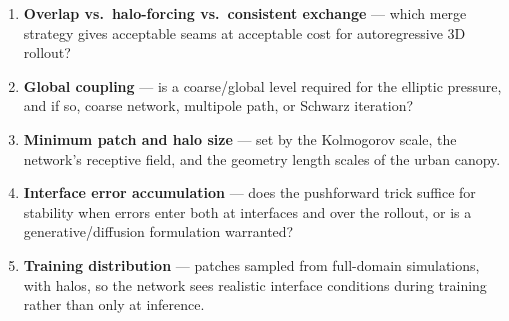 \documentclass[11pt]{article}
\begin{document}
\begin{enumerate}[leftmargin=1.4em]
\item \textbf{Overlap vs.\ halo-forcing vs.\ consistent exchange} --- which merge
strategy gives acceptable seams at acceptable cost for autoregressive 3D rollout?
\item \textbf{Global coupling} --- is a coarse/global level required for the
elliptic pressure, and if so, coarse network, multipole path, or Schwarz
iteration?
\item \textbf{Minimum patch and halo size} --- set by the Kolmogorov scale, the
network's receptive field, and the geometry length scales of the urban canopy.
\item \textbf{Interface error accumulation} --- does the pushforward trick suffice
for stability when errors enter both at interfaces and over the rollout, or is a
generative/diffusion formulation \cite{lienen2024turbdiff,kohl2023benchmarking}
warranted?
\item \textbf{Training distribution} --- patches sampled from full-domain
simulations, with halos, so the network sees realistic interface conditions
during training rather than only at inference.
\end{enumerate}



\end{document}
